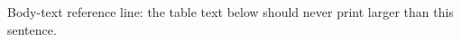 \documentclass{article}
\begin{document}
Body-text reference line: the table text below should never print larger than this sentence.



\end{document}
